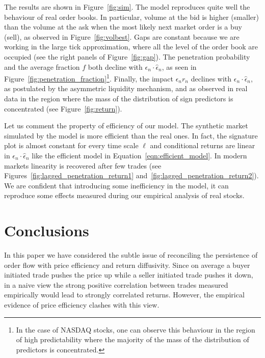 \documentclass[12pt]{iopart}
\begin{document}
The results are shown in Figure~\ref{fig:sim}. The model reproduces quite well the behaviour of real order books. In particular, volume at the bid is higher (smaller) than the volume at the ask when the most likely next market order is a buy (sell), as observed in Figure~\ref{fig:volbest}. Gaps are constant because we are working in the large tick approximation, where all the level of the order book are occupied (see the right panels of Figure~\ref{fig:gap}). The penetration probability and the average fraction $f$ both decline with $\epsilon_n\cdot\hat{\epsilon}_n$, as seen in Figure~\ref{fig:penetration_fraction}\footnote{In the case of NASDAQ stocks, one can observe this behaviour in the region of high predictability where the majority of the mass of the distribution of predictors is concentrated.}. Finally, the impact $\epsilon_n r_n$ declines with $\epsilon_n\cdot\hat{\epsilon}_n$, as postulated by the asymmetric liquidity mechanism, and as observed in real data in the region where the mass of the distribution of sign predictors is concentrated (see Figure~\ref{fig:return}).

Let us comment the property of efficiency of our model. The synthetic market simulated by the model is more efficient than the real ones. In fact, the signature plot is almost constant for every time scale $\ell$ and conditional returns are linear in $\epsilon_n\cdot\hat{\epsilon}_n$ like the efficient model in Equation~\ref{eqn:efficient_model}. In modern markets linearity is recovered after few trades (see Figures~\ref{fig:lagged_penetration_return1} and~\ref{fig:lagged_penetration_return2}). We are confident that introducing some inefficiency in the model, it can reproduce some effects measured during our empirical analysis of real stocks.

\section{Conclusions}
\label{sec:Conclusions}
In this paper we have considered the subtle issue of reconciling the persistence of order flow with price efficiency and return diffusivity. Since on average a buyer initiated trade pushes the price up while a seller initiated trade pushes it down, in a naive view the strong positive correlation between trades measured empirically would lead to strongly correlated returns. However, the empirical evidence of price efficiency clashes with this view. 
\end{document}
